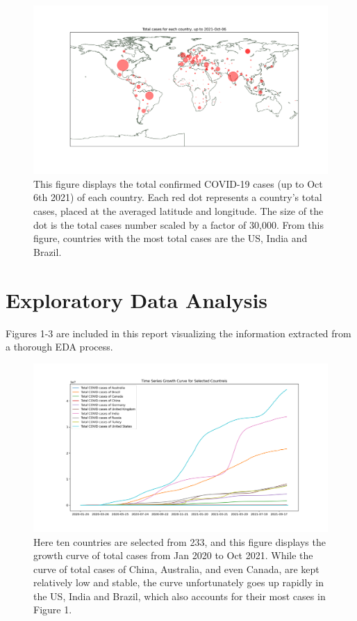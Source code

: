 \documentclass[12pt]{article}
\begin{document}
\begin{figure}[htb]
	\setlength{\abovecaptionskip}{-1.cm}
	\centering
	\includegraphics[width=0.7\linewidth]{../figures/total-cases-map.png} %
	\caption{This figure displays the total confirmed COVID-19 cases (up to Oct 6th 2021) of each country. Each red dot represents a country's total cases, placed at the averaged latitude and longitude. The size of the dot is the total cases number scaled by a factor of 30,000. From this figure, countries with the most total cases are the US, India and Brazil.} %
\end{figure}

\section{Exploratory Data Analysis}
Figures 1-3 are included in this report visualizing the information extracted from a thorough 	EDA process. 

\begin{figure}[htb]
	\setlength{\abovecaptionskip}{-0.5cm}
	\centering
	\includegraphics[width=0.7\linewidth]{../figures/total-cases-time-series.png} %
	\caption{Here ten countries are selected from 233, and this figure displays the growth curve of total cases from Jan 2020 to Oct 2021. While the curve of total cases of China, Australia, and even Canada, are kept relatively low and stable, the curve unfortunately goes up rapidly in the US, India and Brazil, which also accounts for their most cases in Figure 1.} %
\end{figure}
\end{document}
